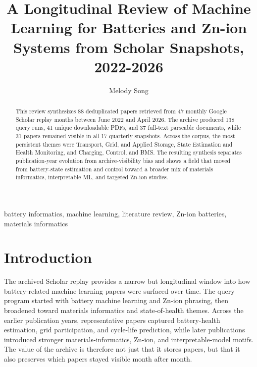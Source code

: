 \documentclass[journal]{IEEEtran}
\begin{document}
\title{ A Longitudinal Review of Machine Learning for Batteries and Zn-ion Systems from Scholar Snapshots, 2022-2026 }

\author{ Melody Song }

\maketitle

\begin{abstract}
This review synthesizes 88 deduplicated papers retrieved from 47 monthly Google Scholar replay months between June 2022 and April 2026. The archive produced 138 query runs, 41 unique downloadable PDFs, and 37 full-text parseable documents, while 31 papers remained visible in all 17 quarterly snapshots. Across the corpus, the most persistent themes were Transport, Grid, and Applied Storage, State Estimation and Health Monitoring, and Charging, Control, and BMS. The resulting synthesis separates publication-year evolution from archive-visibility bias and shows a field that moved from battery-state estimation and control toward a broader mix of materials informatics, interpretable ML, and targeted Zn-ion studies.
\end{abstract}

\begin{IEEEkeywords}
battery informatics, machine learning, literature review, Zn-ion batteries, materials informatics
\end{IEEEkeywords}

\section{Introduction}
The archived Scholar replay provides a narrow but longitudinal window into how battery-related machine learning papers were surfaced over time. The query program started with battery machine learning and Zn-ion phrasing, then broadened toward materials informatics and state-of-health themes. Across the earlier publication years, representative papers \cite{participationofbattery2020,acceleratingfunctionalma2013,machinelearningbased2021,machinelearningsystems2018} captured battery-health estimation, grid participation, and cycle-life prediction, while later publications \cite{machinelearningdriven2025,recentadvancesin2025,interpretablemachinelear2025,datadrivenapproaches2024,predictivedesignof2024} introduced stronger materials-informatics, Zn-ion, and interpretable-model motifs. The value of the archive is therefore not just that it stores papers, but that it also preserves which papers stayed visible month after month.
\end{document}
